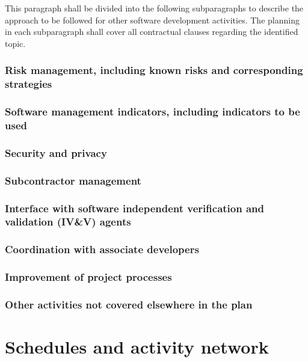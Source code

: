 \documentclass{fidata-report-template}
\begin{document}
This paragraph shall be divided into the following subparagraphs to
describe the approach to be followed for other software development
activities. The planning in each subparagraph shall cover all
contractual clauses regarding the identified topic.

\subsubsection{Risk management, including known risks and corresponding
strategies}

\subsubsection{Software management indicators, including indicators to
be used}

\subsubsection{Security and privacy}

\subsubsection{Subcontractor management}

\subsubsection{Interface with software independent verification and
validation (IV\&V) agents}

\subsubsection{Coordination with associate developers}

\subsubsection{Improvement of project processes}

\subsubsection{Other activities not covered elsewhere in the plan}

\section{Schedules and activity network}
\end{document}
